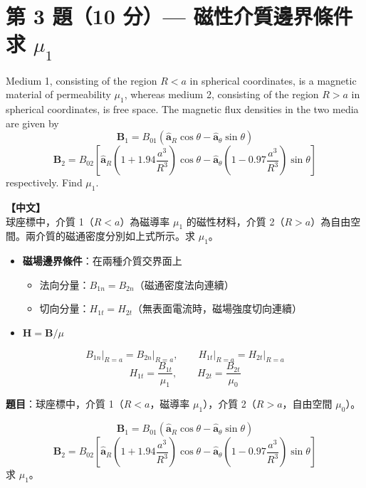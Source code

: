 \documentclass[12pt,a4paper]{article}
\newcommand{\vB}{\mathbf{B}}
\newcommand{\vH}{\mathbf{H}}
\newcommand{\aR}{\hat{\mathbf{a}}_R}
\newcommand{\ath}{\hat{\mathbf{a}}_\theta}
\begin{document}
\section{第 3 題（10 分）— 磁性介質邊界條件求 $\mu_1$}

\begin{questionbox}
Medium 1, consisting of the region $R < a$ in spherical coordinates, is a magnetic material of permeability $\mu_1$, whereas medium 2, consisting of the region $R > a$ in spherical coordinates, is free space. The magnetic flux densities in the two media are given by
\[
  \vB_1 = B_{01}(\aR \cos\theta - \ath \sin\theta)
\]
\[
  \vB_2 = B_{02}\left[\aR\left(1 + 1.94\frac{a^3}{R^3}\right)\cos\theta - \ath\left(1 - 0.97\frac{a^3}{R^3}\right)\sin\theta\right]
\]
respectively. Find $\mu_1$.

\medskip\noindent\textbf{【中文】}\\
球座標中，介質 1（$R < a$）為磁導率 $\mu_1$ 的磁性材料，介質 2（$R > a$）為自由空間。兩介質的磁通密度分別如上式所示。求 $\mu_1$。
\end{questionbox}

\begin{conceptbox}[核心概念]
\begin{itemize}
  \item \textbf{磁場邊界條件}：在兩種介質交界面上
    \begin{itemize}
      \item 法向分量：$B_{1n} = B_{2n}$（磁通密度法向連續）
      \item 切向分量：$H_{1t} = H_{2t}$（無表面電流時，磁場強度切向連續）
    \end{itemize}
  \item $\vH = \vB / \mu$
\end{itemize}
\end{conceptbox}

\begin{formulabox}[相關公式]
\[
  B_{1n}\big|_{R=a} = B_{2n}\big|_{R=a}, \qquad
  H_{1t}\big|_{R=a} = H_{2t}\big|_{R=a}
\]
\[
  H_{1t} = \frac{B_{1t}}{\mu_1}, \qquad H_{2t} = \frac{B_{2t}}{\mu_0}
\]
\end{formulabox}

\textbf{題目}：球座標中，介質 1（$R < a$，磁導率 $\mu_1$），介質 2（$R > a$，自由空間 $\mu_0$）。

\[
  \vB_1 = B_{01}(\aR \cos\theta - \ath \sin\theta)
\]
\[
  \vB_2 = B_{02}\left[\aR\left(1 + 1.94\frac{a^3}{R^3}\right)\cos\theta
  - \ath\left(1 - 0.97\frac{a^3}{R^3}\right)\sin\theta\right]
\]
求 $\mu_1$。
\end{document}

